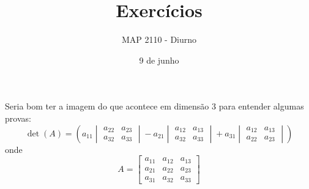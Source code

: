 \documentclass{beamer}
\title[Exercícios]{Exercícios}
\author{MAP 2110 - Diurno}
\institute{IME USP}
\date{9 de junho}
\begin{document}
\begin{frame}
  \titlepage
\end{frame}



\begin{frame}{}
  Seria bom ter a imagem do que acontece em dimensão 3
  para entender algumas provas:
  $$ \det(A) = \left( a_{11}
  \begin{vmatrix}
   a_{22} & a_{23} \\
   a_{32} & a_{33}
 \end{vmatrix} -
  a_{21}
  \begin{vmatrix}
   a_{12} & a_{13} \\
   a_{32} & a_{33}
 \end{vmatrix} + a_{31}
 \begin{vmatrix}
   a_{12} & a_{13}\\
   a_{22} & a_{23}
 \end{vmatrix} \right)$$
 onde 
 $$ A = \begin{bmatrix}
  a_{11} & a_{12} & a_{13} \\
  a_{21} & a_{22} & a_{23} \\
  a_{31} & a_{32} & a_{33} 
   \end{bmatrix}$$
\end{frame}
\end{document}
